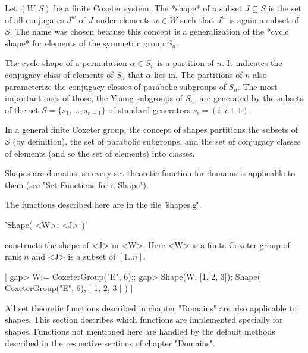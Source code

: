 
Let $(W,  S)$ be  a finite Coxeter  system.  The  *shape* of a  subset $J
\subseteq S$ is the set of  all conjugates $J^w$ of $J$ under elements $w
\in W$  such that $J^w$ is  again a subset  of $S$.  The name  was chosen
because  this  concept is  a  generalization  of  the *cycle  shape*  for
elements of the symmetric group $S_n$.

The cycle shape of a permutation $\alpha  \in S_n$ is a partition of $n$. 
It indicates the conjugacy class  of elements of $S_n$ that $\alpha$ lies
in.  The  partitions of  $n$ also parameterize  the conjugacy  classes of
parabolic  subgroups of  $S_n$.  The  most important  ones of  those, the
Young subgroups  of $S_n$, are generated by  the subsets of the  set $S =
\{s_1, \dots, s_{n-1}\}$ of standard generators $s_i = (i, i+1)$.

In a general  finite Coxeter group, the concept  of shapes partitions the
subsets of $S$  (by definition), the set of  parabolic subgroups, and the
set of  conjugacy classes of elements  (and so the set  of elements) into
classes.

Shapes are domains, so every set theoretic function for domains is
applicable to them (see "Set Functions for a Shape").

The functions described here are in the file '\"shapes.g\"'.

%

'Shape( <W>, <J> )'

constructs the shape  of <J> in <W>.  Here <W> is  a finite Coxeter group
of rank $n$ and <J> is a subset of $[1..n]$.

|    gap> W:= CoxeterGroup("E", 6);; 
    gap> Shape(W, [1, 2, 3]);
    Shape( CoxeterGroup("E", 6), [ 1, 2, 3 ] ) |


All  set theoretic  functions  described in  chapter  "Domains" are  also
applicable  to  shapes.   This  section  describes  which  functions  are
implemented  specially  for shapes.   Functions  not  mentioned here  are
handled by  the default methods  described in the respective  sections of
chapter "Domains".

